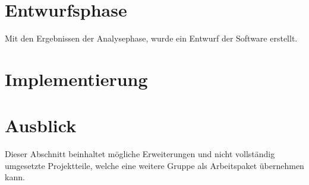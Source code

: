 \section{Entwurfsphase}
Mit den Ergebnissen der Analysephase, wurde ein Entwurf der Software erstellt.
\section{Implementierung}
 
\section{Ausblick}
Dieser Abschnitt beinhaltet mögliche Erweiterungen und nicht vollständig umgesetzte Projektteile, welche eine weitere Gruppe als Arbeitspaket übernehmen kann. 




